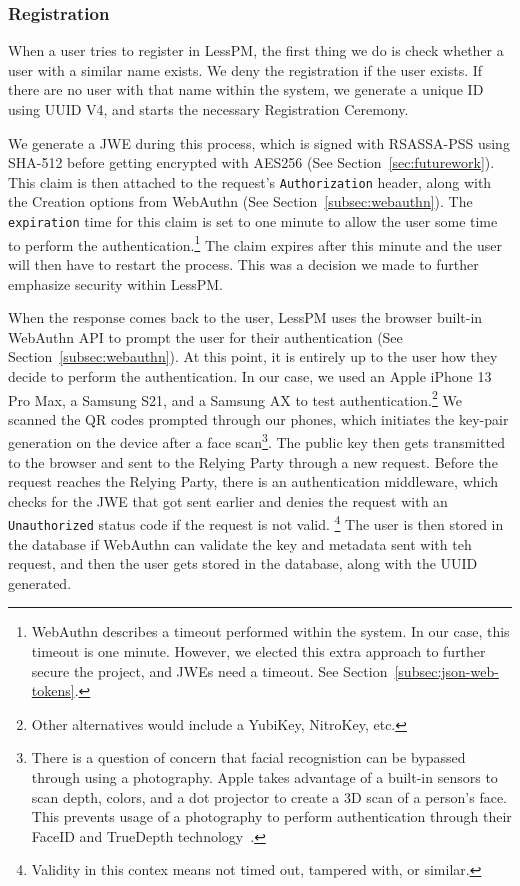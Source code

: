 \subsubsection{Registration}
When a user tries to register in LessPM, the first thing we do is check
whether a user with a similar name exists.
We deny the registration if the user exists.
If there are no user with that name within the system, we generate a unique ID
using UUID V4, and starts the necessary Registration Ceremony.

We generate a JWE during this process, which is signed with RSASSA-PSS
using SHA-512 before getting encrypted with AES256 (See
Section~\ref{sec:futurework}).
This claim is then attached to the request's \texttt{Authorization} header,
along with the Creation options from WebAuthn (See
Section~\ref{subsec:webauthn}).
The \texttt{expiration} time for this claim is set to one minute to allow the
user some time to perform the authentication.\footnote{
  WebAuthn describes a timeout performed within the system. In our case, this
  timeout is one minute.
  However, we elected this extra approach to further secure the project, and
  JWEs need a timeout. See Section~\ref{subsec:json-web-tokens}.
}
The claim expires after this minute and the user will then have to restart the
process.
This was a decision we made to further emphasize security within LessPM\@.

When the response comes back to the user, LessPM uses the browser built-in
WebAuthn API to prompt the user for their authentication (See
Section~\ref{subsec:webauthn}).
At this point, it is entirely up to the user how they decide to perform the
authentication.
In our case, we used an Apple iPhone 13 Pro Max, a Samsung S21, and a Samsung
AX  to test authentication.\footnote{
  Other alternatives would include a YubiKey, NitroKey, etc.
}
We scanned the QR codes prompted through our phones, which initiates the
key-pair generation on the device after a face scan\footnote{
  There is a question of concern that facial recognistion can be bypassed
  through using a photography.
  Apple takes advantage of a built-in sensors to
  scan depth, colors, and a dot projector to create a 3D scan of a person's
  face.
  This prevents usage of a photography to perform authentication through
  their FaceID and TrueDepth technology~\cite{apple-support}.
}.
The public key then gets transmitted to the browser and sent to the Relying
Party through a new request.
Before the request reaches the Relying Party, there is an authentication
middleware, which checks for the JWE that got sent earlier and denies the
request with an \texttt{Unauthorized} status code if the request is not valid.
\footnote{
  Validity in this contex means not timed out, tampered with, or similar.
}
The user is then stored in the database if WebAuthn can validate the key and
metadata sent with teh request, and then the user gets stored in the database,
along with the UUID generated.

